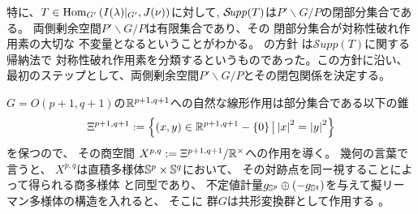\documentclass[12pt]{article} %
\newcommand{\Hom}{\mbox{\normalfont Hom}}
\newcommand{\Supp}{\mathcal{S}\!{\it upp}}
\theoremstyle{definition}
\theoremstyle{exampstyle} \newtheorem{examp}[theorem]{Theorem}
\newcommand{\IlambdaGprime}{I(\lambda)\kern-0.3em\mid_{G'}}
\newcommand{\SBO}{\Hom_{G'}\left(\IlambdaGprime,J(\nu) \right)}
\renewcommand{\setminus}{-}
\begin{document}
特に、$T\in\SBO$に対して, $\Supp(T)$は$P'\backslash G/P$の閉部分集合である。
両側剰余空間$P'\backslash G/P$は有限集合であり、その
閉部分集合が対称性破れ作用素の大切な
不変量となるということがわかる。
\cite{kobayashi2015symmetry}の方針
は$\mathcal{S}upp(T)$に関する帰納法で
対称性破れ作用素を分類するというものであった。この方針に沿い、最初のステップとして、両側剰余空間$P'\backslash G/P$とその閉包関係を決定する。

$G=O(p+1,q+1)$の$\mathbb{R}^{p+1,q+1}$への自然な線形作用は部分集合である以下の錐
$$\Xi^{p+1,q+1}:=\mysetn{(x,y)\in\R^{p+1,q+1}\setminus\left\{ 0 \right\}}{\myabs{x}^2=\myabs{y}^2}$$
を保つので、
その商空間
$X^{p,q}:=\Xi^{p+1,q+1}/\mathbb{R}^{\times}$への作用を導く。
幾何の言葉で言うと、
$X^{p,q}$は{直積多様体$\mathbb{S}^p\times\mathbb{S}^q$に{おいて}、
その対跡点を同ー視することによって得られる商多様体
と同型であり、
不定値計量$g_{\mathbb{S}^p}\oplus \left( -g_{\mathbb{S}^q} \right)$を与えて擬リーマン多様体の構造を入れると、
そこに
群$G$は共形変換群として作用する}
。
\end{document}
